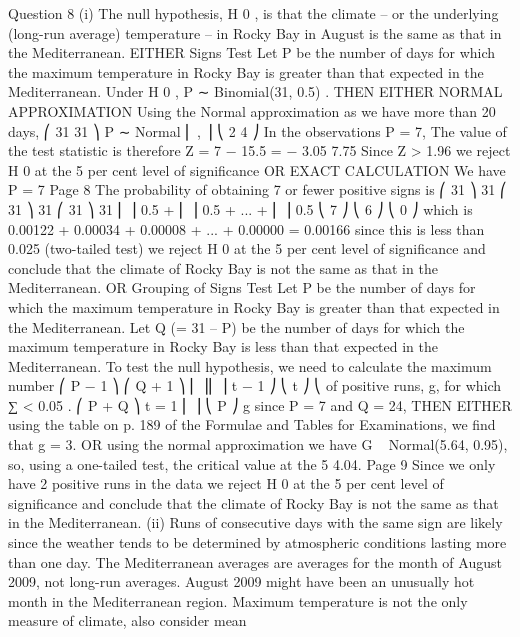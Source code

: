 \documentclass[a4paper,12pt]{article}
\begin{document}
\begin{enumerate}


Question 8
(i)
The null hypothesis, H 0 , is that the climate – or the underlying (long-run average)
temperature – in Rocky Bay in August is the same as that in the Mediterranean.
EITHER
Signs Test
Let P be the number of days for which the maximum temperature in Rocky Bay is
greater than that expected in the Mediterranean.
Under H 0 , P ∼ Binomial(31, 0.5) .
THEN EITHER NORMAL APPROXIMATION
Using the Normal approximation as we have more than 20 days,
⎛ 31 31 ⎞
P ∼ Normal ⎜ , ⎟
⎝ 2 4 ⎠
In the observations P = 7,
The value of the test statistic is therefore
Z =
7 − 15.5
= − 3.05
7.75
Since Z > 1.96 we reject H 0 at the 5 per cent level of significance
OR EXACT CALCULATION
We have P = 7
Page 8 %
The probability of obtaining 7 or fewer positive signs is
⎛ 31 ⎞ 31 ⎛ 31 ⎞ 31
⎛ 31 ⎞ 31
⎜ ⎟ 0.5 + ⎜ ⎟ 0.5 + ... + ⎜ ⎟ 0.5
⎝ 7 ⎠
⎝ 6 ⎠
⎝ 0 ⎠
which is 0.00122 + 0.00034 + 0.00008 + ... + 0.00000 = 0.00166
since this is less than 0.025 (two-tailed test)
we reject H 0 at the 5 per cent level of significance
and conclude that the climate of Rocky Bay is not the same as that in the
Mediterranean.
OR
Grouping of Signs Test
Let P be the number of days for which the maximum temperature in Rocky Bay is
greater than that expected in the Mediterranean.
Let Q (= 31 – P) be the number of days for which the maximum temperature in Rocky
Bay is less than that expected in the Mediterranean.
To test the null hypothesis, we need to calculate the maximum number
⎛ P − 1 ⎞ ⎛ Q + 1 ⎞
⎜
⎟⎜
⎟
t − 1 ⎠ ⎝ t ⎠
⎝
of positive runs, g, for which ∑
< 0.05 .
⎛ P + Q ⎞
t = 1
⎜
⎟
⎝ P ⎠
g
since P = 7 and Q = 24,
THEN EITHER
using the table on p. 189 of the Formulae and Tables for Examinations,
we find that g = 3.
OR
using the normal approximation we have
G ~ Normal(5.64, 0.95),
so, using a one-tailed test, the critical value at the 5%
4.04.
Page 9 %
Since we only have 2 positive runs in the data we reject H 0 at the 5 per cent level of
significance and conclude that the climate of Rocky Bay is not the same as that in the
Mediterranean.
(ii)
Runs of consecutive days with the same sign are likely since the weather tends to be
determined by atmospheric conditions lasting more than one day.
The Mediterranean averages are averages for the month of August 2009,
not long-run averages.
August 2009 might have been an unusually hot month in the Mediterranean region.
Maximum temperature is not the only measure of climate, also consider mean

\end{enumerate}
\end{document}
